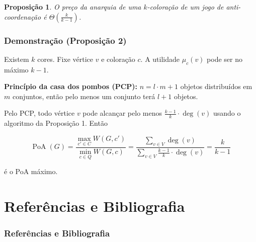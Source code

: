 \documentclass{beamer}
\DeclareMathOperator*{\PoA}{\text{PoA}}
\theoremstyle{plain}
\newtheorem{proposition}{Proposição}
\begin{document}
\begin{frame}
  \begin{proposition}
    O preço da anarquia de uma $k$-coloração de um jogo de anti-coordenação é $\Theta\left(
    \frac{k}{k-1}\right)$.
  \end{proposition}
\end{frame}

\begin{frame}
  \frametitle{Demonstração (Proposição 2)}
  Existem $k$ cores. Fixe vértice $v$ e coloração $c$. A utilidade $\mu_c(v)$ pode ser no máximo
  $k-1$.

  \textbf{Princípio da casa dos pombos (PCP):} $n=l\cdot m+1$ objetos distribuídos em $m$
  conjuntos, então pelo menos um conjunto terá $l+1$ objetos.

  Pelo PCP, todo vértice $v$ pode alcançar pelo menos $\frac{k-1}{k}\cdot\deg(v)$ usando o
  algoritmo da Proposição 1. Então

  \begin{equation*}
    \PoA(G)=\frac{\max_{c'\in C} W(G,c')}{\min_{c\in Q}W(G,c)}=\frac{\sum_{v\in
      V}\deg(v)}{\sum_{v\in V}\frac{k-1}{k}\cdot\deg(v)}=\frac{k}{k-1}
  \end{equation*}

  é o PoA máximo.
\end{frame}

\begin{frame}
\end{frame}


\section[Referências]{Referências e Bibliografia}
\begin{frame}[t,allowframebreaks]
  \frametitle{Referências e Bibliografia}
  \nocite{*}
  \printbibliography[]
\end{frame}
\end{document}

